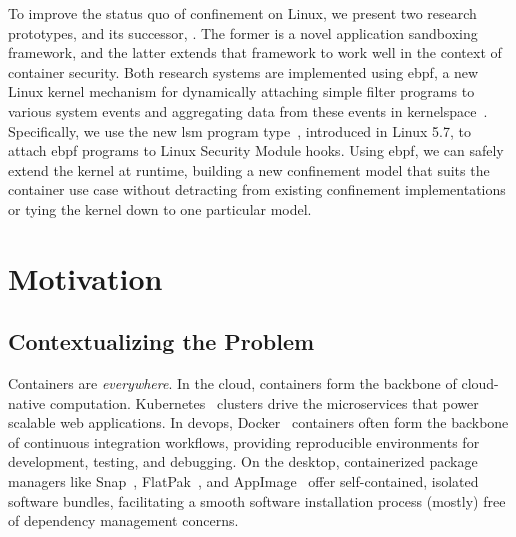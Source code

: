 To improve the status quo of confinement on Linux, we present two research prototypes,
\bpfbox{} and its successor, \bpfcontain{}. The former is a novel application sandboxing
framework, and the latter extends that framework to work well in the context of container
security. Both research systems are implemented using \gls{ebpf}, a new Linux kernel mechanism
for dynamically attaching simple filter programs to various system events and aggregating
data from these events in kernelspace~\cite{gregg2019_bpf, starovoitov2014_ebpf}.
Specifically, we use the new \gls{lsm} program type~\cite{singh2019_krsi}, introduced in Linux
5.7, to attach \gls{ebpf} programs to Linux Security Module hooks. Using \gls{ebpf}, we can safely
extend the kernel at runtime, building a new confinement model that suits the container
use case without detracting from existing confinement implementations or tying the kernel
down to one particular model.


\section{Motivation}%
\label{s:motivation}

\subsection{Contextualizing the Problem}%
\label{ss:contextualizing-the-problem}

Containers are \textit{everywhere}. In the cloud, containers form the backbone of
cloud-native computation. Kubernetes~ clusters drive the microservices that
power scalable web applications. In devops, Docker~ containers often form the
backbone of continuous integration workflows, providing reproducible environments for
development, testing, and debugging. On the desktop, containerized package managers like
Snap~, FlatPak~, and AppImage~ offer self-contained,
isolated software bundles, facilitating a smooth software installation process (mostly)
free of dependency management concerns.

